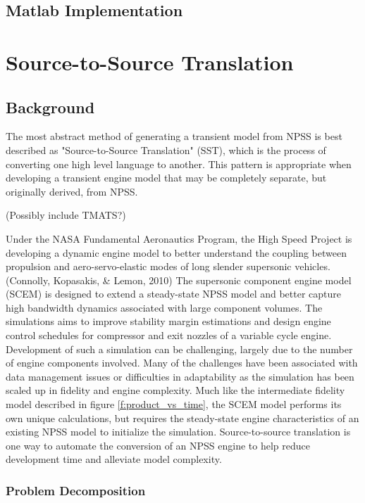 \documentclass[heading.tex]{subfiles}
\begin{document}
\subsection{Matlab Implementation}

\section{Source-to-Source Translation}
\subsection{Background}

The most abstract method of generating a transient model from NPSS is best described as "Source-to-Source Translation"
(SST), which is the process of converting one high level language to another. This pattern is appropriate when developing
a transient engine model that may be completely separate, but originally derived, from NPSS.


(Possibly include TMATS?)

	Under the NASA Fundamental Aeronautics Program, the High Speed Project is developing a dynamic engine model
to better understand the coupling between propulsion and  aero-servo-elastic modes of long slender
supersonic vehicles. (Connolly, Kopasakis, \& Lemon, 2010) The supersonic component engine model (SCEM) is 
designed to extend a steady-state NPSS model and better capture high bandwidth dynamics associated with large
component volumes. The simulations aims to improve stability margin estimations and design engine control schedules
for compressor and exit nozzles of a variable cycle engine. Development of such a simulation can be challenging,
largely due to the number of engine components involved. Many of the challenges have been associated with data
management issues or difficulties in adaptability as the simulation has been scaled up in fidelity and engine complexity. 
Much like the intermediate fidelity model described in figure \ref{f:product_vs_time}, the SCEM model performs its
own unique calculations, but requires the steady-state engine characteristics of an existing NPSS model to initialize
the simulation. Source-to-source translation is one way to automate the conversion of an NPSS engine to help
reduce development time and alleviate model complexity.

\subsubsection{Problem Decomposition}
\end{document}
